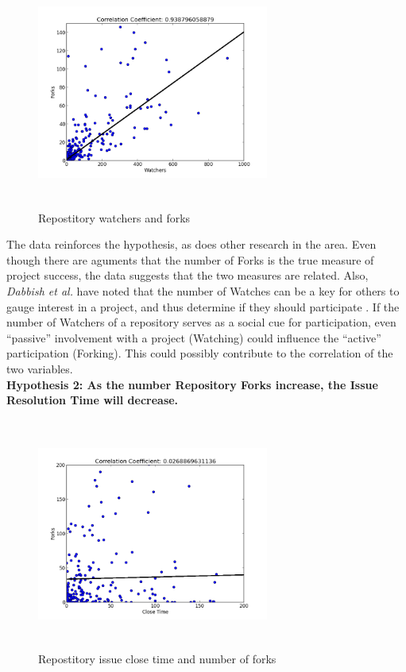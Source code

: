 \documentclass{proc}
\begin{document}
\begin{figure}
\includegraphics[height=3in,width=3in]{images/watcher_forks_scatterplot.png}
\caption{Repostitory watchers and forks}
\end{figure}

The data reinforces the hypothesis, as does other research in the area. Even though there are aguments that the number of Forks is the true measure of project success\cite{baudry2012towards}, the data suggests that the two measures are related. Also, \textit{Dabbish et al.} have noted that the number of Watches can be a key for others to gauge interest in a project, and thus determine if they should participate \cite{dabbish2013leveraging}. If the number of Watchers of a repository serves as a social cue for participation, even ``passive'' involvement with a project (Watching) could influence the ``active'' participation (Forking). This could possibly contribute to the correlation of the two variables.\\

\textbf{Hypothesis 2: As the number Repository Forks increase, the Issue Resolution Time will decrease.}\\

\begin{figure}
\includegraphics[height=3in,width=3in]{images/issue_close_time_forks_scatterplot.png}
\caption{Repostitory issue close time and number of forks}
\label{fig:issue_close_time_forks_scatterplot}
\end{figure}
\end{document}
